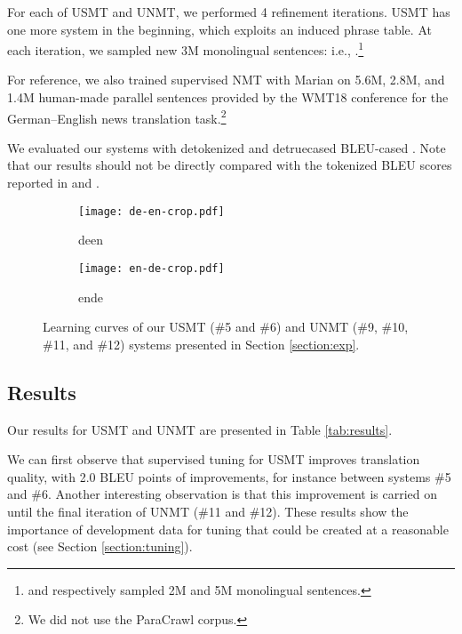 \documentclass[11pt,a4paper]{article}
\newcommand{\marian}{Marian}
\begin{document}
For each of USMT and UNMT, we performed 4 refinement iterations. USMT has one more system in the beginning, which exploits an induced phrase table. At each iteration, we sampled new 3M monolingual sentences: i.e., .\footnote{\citet{artetxe2018unsupervised} and \citet{DBLP:journals/corr/abs-1804-07755} respectively sampled 2M and 5M monolingual sentences.}

For reference, we also trained supervised NMT with {\marian} on 5.6M, 2.8M, and 1.4M human-made parallel sentences provided by the WMT18 conference for the German--English news translation task.\footnote{We did not use the ParaCrawl corpus.}

We evaluated our systems with detokenized and detruecased BLEU-cased \citep{papineni-EtAl:2002:ACL}. Note that our results should not be directly compared with the tokenized BLEU scores reported in \citet{artetxe2018unsupervised} and \citet{DBLP:journals/corr/abs-1804-07755}. 

\begin{figure*}[t]
    \centering
     \begin{subfigure}[b]{0.48\textwidth}
        \texttt{[image: de-en-crop.pdf]}
        \caption{deen}
        \label{fig:deenlc}
    \end{subfigure}
    \begin{subfigure}[b]{0.48\textwidth}
        \texttt{[image: en-de-crop.pdf]}
        \caption{ende}
        \label{fig:endelc}
    \end{subfigure}
    \caption{\label{fig:lc}Learning curves of our USMT (\#5 and \#6) and UNMT (\#9, \#10, \#11, and \#12) systems presented in Section \ref{section:exp}.}
\end{figure*}


\subsection{Results}

Our results for USMT and UNMT are presented in Table \ref{tab:results}. 

We can first observe that supervised tuning for USMT improves translation quality, with 2.0 BLEU points of improvements, for instance between systems \#5 and \#6. Another interesting observation is that this improvement is carried on until the final iteration of UNMT (\#11 and \#12). These results show the importance of development data for tuning that could be created at a reasonable cost (see Section \ref{section:tuning}).
\end{document}
